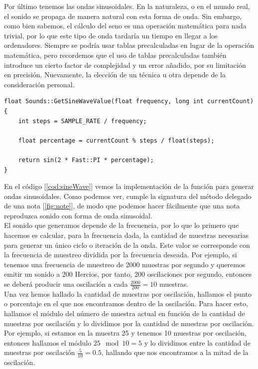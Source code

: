 Por último tenemos las ondas sinusoidales. En la naturaleza, o en el mundo real, el sonido se propaga de manera natural con esta forma de onda. Sin embargo, como bien sabemos, el cálculo del seno es una operación matemática para nada trivial, por lo que este tipo de onda tardaría un tiempo en llegar a los ordenadores. Siempre se podría usar tablas precalculadas en lugar de la operación matemática, pero recordemos que el uso de tablas precalculadas también introduce un cierto factor de complejidad y un error añadido, por su limitación en precisión. Nuevamente, la elección de un técnica u otra depende de la consideración personal.\\

\begin{lstlisting}[style=C-color, caption={Cálculo de una onda sinusoidal con una frecuencia determinada},label=cod:sineWave, escapechar=|]
float Sounds::GetSineWaveValue(float frequency, long int currentCount)
{
    int steps = SAMPLE_RATE / frequency;

    float percentage = currentCount % steps / float(steps);

    return sin(2 * Fast::PI * percentage);
}
\end{lstlisting}

En el código [\ref{cod:sineWave}] vemos la implementación de la función para generar ondas sinusoidales. Como podemos ver, cumple la signatura del método delegado de una nota [\ref{fig:note}], de modo que podemos hacer fácilmente que una nota reproduzca sonido con forma de onda sinusoidal.\\

El sonido que generamos depende de la frecuencia, por lo que lo primero que hacemos es calcular, para la frecuencia dada, la cantidad de muestras necesarias para generar un único ciclo o iteración de la onda. Este valor se corresponde con la frecuencia de muestreo dividida por la frecuencia deseada. Por ejemplo, si tenemos una frecuencia de muestreo de 2000 muestras por segundo y queremos emitir un sonido a 200 Hercios, por tanto, 200 oscilaciones por segundo, entonces se deberá producir una oscilación a cada \(\frac{2000}{200} = 10\) muestras.\\

Una vez hemos hallado la cantidad de muestras por oscilación, hallamos el punto o porcentaje en el que nos encontramos dentro de la oscilación. Para hacer esto, hallamos el módulo del número de muestra actual en función de la cantidad de muestras por oscilación y lo dividimos por la cantidad de muestras por oscilación. Por ejemplo, si estamos en la muestra 25 y tenemos 10 muestras por oscilación, entonces hallamos el módulo \(25\mod 10 = 5\) y lo dividimos entre la cantidad de muestras por oscilación \(\frac{5}{10} = 0.5\), hallando que nos encontramos a la mitad de la oscilación.\\

